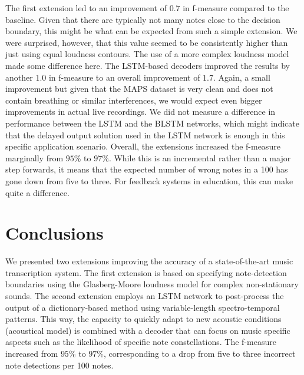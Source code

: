 \documentclass{article}
\begin{document}
The first extension led to an improvement of $0.7$ in f-measure compared to the baseline. Given that there are typically not many notes close to the decision boundary, this might be what can be expected from such a simple extension. We were surprised, however, that this value seemed to be consistently higher than just using equal loudness contours. The use of a more complex loudness model made some difference here.
The LSTM-based decoders improved the results by another $1.0$ in f-measure to an overall improvement of $1.7$. Again, a small improvement but given that the MAPS dataset is very clean and does not contain breathing or similar interferences, we would expect even bigger improvements in actual live recordings. We did not measure a difference in performance between the LSTM and the BLSTM networks, which might indicate that the delayed output solution used in the LSTM network is enough in this specific application scenario.
Overall, the extensions increased the f-measure marginally from $95$\% to $97\%$. While this is an incremental rather than a major step forwards, it means that the expected number of wrong notes in a 100 has gone down from five to three. For feedback systems in education, this can make quite a difference. 

\section{Conclusions}
\label{sec:conclusions}

We presented two extensions improving the accuracy of a state-of-the-art music transcription system. The first extension is based on specifying note-detection boundaries using the Glasberg-Moore loudness model for complex non-stationary sounds. The second extension employs an LSTM network to post-process the output of a dictionary-based method using variable-length spectro-temporal patterns. This way, the capacity to quickly adapt to new acoustic conditions (acoustical model) is combined with a decoder that can focus on music specific aspects such as the likelihood of specific note constellations.
The f-measure increased from $95$\% to $97\%$, corresponding to a drop from five to three incorrect note detections per 100 notes.



\end{document}
